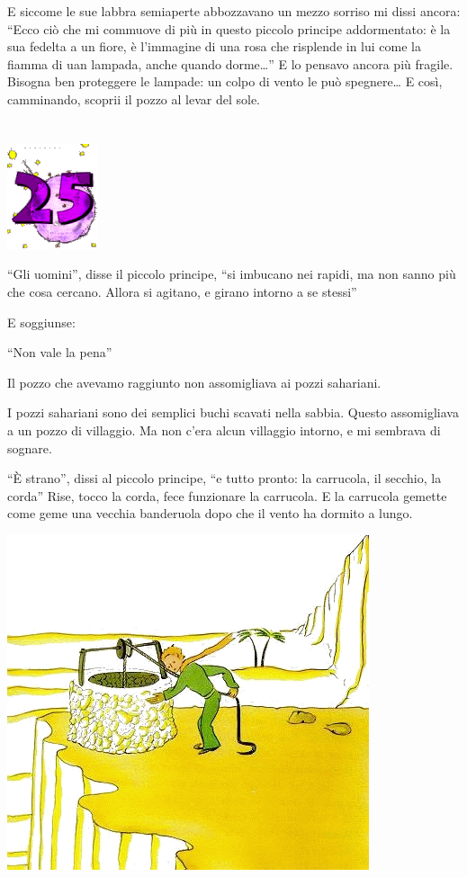 \documentclass[11pt]{scrbook}
\begin{document}
E siccome le sue labbra semiaperte abbozzavano un mezzo sorriso mi dissi ancora: ``Ecco ciò che mi commuove di più in questo piccolo principe addormentato: è la sua fedelta a un fiore, è l'immagine di una rosa che risplende in lui come la fiamma di uan lampada, anche quando dorme\ldots{}'' E lo pensavo ancora più fragile. Bisogna ben proteggere
le lampade: un colpo di vento le può spegnere\ldots{} E così, camminando, scoprii il pozzo al levar del sole.

\chapter{}
\begin{center}
\includegraphics{img/chapter25}
\end{center}

``Gli uomini'', disse il piccolo principe, ``si imbucano nei rapidi, ma
non sanno più che cosa cercano. Allora si agitano, e girano intorno a se
stessi''

E soggiunse:

``Non vale la pena''

Il pozzo che avevamo raggiunto non assomigliava ai pozzi sahariani.

I pozzi sahariani sono dei semplici buchi scavati nella sabbia. Questo
assomigliava a un pozzo di villaggio. Ma non c'era alcun villaggio
intorno, e mi sembrava di sognare.

``È strano'', dissi al piccolo principe, ``e tutto pronto: la carrucola,
il secchio, la corda'' Rise, tocco la corda, fece funzionare la
carrucola. E la carrucola gemette come geme una vecchia banderuola dopo
che il vento ha dormito a lungo.

\begin{center}
\includegraphics{img/25a}
\end{center}
\end{document}
